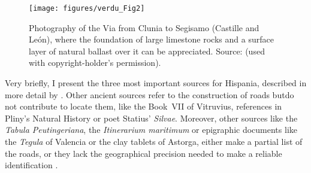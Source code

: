 	\begin{figure}[!htb]
		\texttt{[image: figures/verdu\_Fig2]}
		\caption{Photography of the Via from Clunia to Segisamo (Castille and León), where the foundation of large limestone rocks and a surface layer of natural ballast over it can be appreciated. Source: \textcite[24]{Moreno_2004} (used with copyright-holder’s permission).}
		\label{fig:verdu_Fig2}
	\end{figure}	
Very  briefly, I present the three most important sources for Hispania, described in more detail by \textcite{Roldán_1975}. Other ancient sources refer to the construction of roads butdo not contribute to locate them, like the Book~VII of Vitruvius, references in Pliny’s Natural History or poet Statius’ \textit{Silvae}. Moreover, other sources like the \textit{Tabula Peutingeriana}, the \textit{Itinerarium maritimum} or epigraphic documents like the \textit{Tegula} of Valencia or the clay tablets of Astorga, either make a partial list of the roads, or they lack the geographical precision needed to make a reliable identification \parencites[3]{Arias_1987}[102--175]{Roldán_1975}.
	
